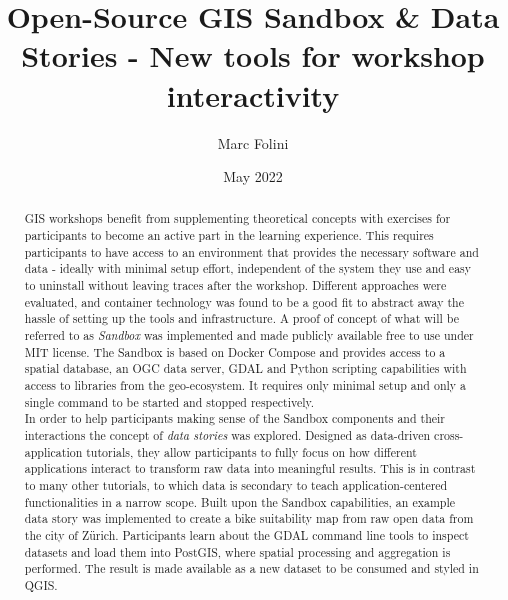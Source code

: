 \documentclass[11pt, a4paper, oneside, parskip=full-]{scrartcl}
\title{Open-Source GIS Sandbox \& Data Stories - New tools for workshop interactivity}
\author{Marc Folini}
\date{May 2022}
\begin{document}
\begin{titlepage}
\setcounter{page}{1}
\clearpage\maketitle
\thispagestyle{empty}
\begin{abstract}
GIS workshops benefit from supplementing theoretical concepts with exercises for
participants to become an active part in the learning experience. This requires
participants to have access to an environment that provides the necessary
software and data - ideally with minimal setup effort, independent of the system
they use and easy to uninstall without leaving traces after the workshop.
Different approaches were evaluated, and container technology was found to be a
good fit to abstract away the hassle of setting up the tools and infrastructure.
A proof of concept of what will be referred to as \emph{Sandbox} was implemented
and made publicly available free to use under MIT license. The Sandbox is based
on Docker Compose and provides access to a spatial database, an OGC data server,
GDAL and Python scripting capabilities with access to libraries from the
geo-ecosystem. It requires only minimal setup and only a single command to be
started and stopped respectively.\\

In order to help participants making sense of the Sandbox components and their
interactions the concept of \emph{data stories} was explored. Designed as
data-driven cross-application tutorials, they allow participants to fully focus
on how different applications interact to transform raw data into meaningful
results. This is in contrast to many other tutorials, to which data is secondary
to teach application-centered functionalities in a narrow scope. Built upon the
Sandbox capabilities, an example data story was implemented to create a bike
suitability map from raw open data from the city of Zürich. Participants learn
about the GDAL command line tools to inspect datasets and load them into
PostGIS, where spatial processing and aggregation is performed. The result is
made available as a new dataset to be consumed and styled in QGIS.
\end{abstract}
\end{titlepage}

\newpage
\tableofcontents
\end{document}
